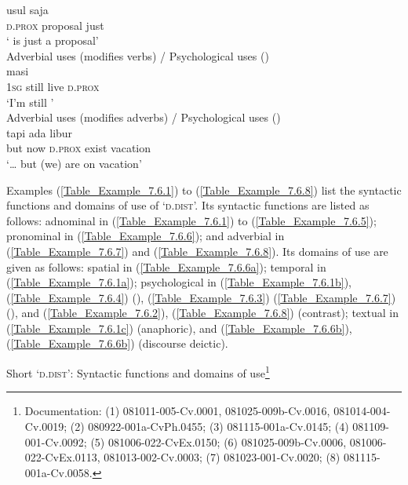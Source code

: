 {\ex\label{Table_Example_7.5.5c}
\gll  {} {usul} {saja}  \\
 \textsc{d.prox} proposal just  \\
\glt ‘ is just a proposal’\\
\z
\z
\ea\label{Table_Example_7.5.6}
Adverbial uses (modifies verbs) / Psychological uses ()\\
 {masi}    \\
 \textsc{1sg} still live \textsc{d.prox}  \\
\glt ‘I’m still   ’\\
\z
\ea\label{Table_Example_7.5.7} Adverbial uses (modifies adverbs) / Psychological uses ()\\
\gll {\ldots} {tapi}   {ada} {libur}  \\
{} but now \textsc{d.prox} exist vacation  \\
\glt ‘{\ldots} but  (we) are on vacation’ \\
\z

Examples  (\ref{Table_Example_7.6.1}) to (\ref{Table_Example_7.6.8}) list the syntactic functions and domains of use of  ‘\textsc{d.dist}’. Its syntactic functions are listed as follows: adnominal in (\ref{Table_Example_7.6.1}) to (\ref{Table_Example_7.6.5}); pronominal in (\ref{Table_Example_7.6.6}); and adverbial in (\ref{Table_Example_7.6.7}) and (\ref{Table_Example_7.6.8}). Its domains of use are given as follows: spatial in (\ref{Table_Example_7.6.6a}); temporal in (\ref{Table_Example_7.6.1a}); psychological in (\ref{Table_Example_7.6.1b}), (\ref{Table_Example_7.6.4}) (), (\ref{Table_Example_7.6.3}) (\ref{Table_Example_7.6.7}) (), and (\ref{Table_Example_7.6.2}), (\ref{Table_Example_7.6.8}) (contrast); textual in (\ref{Table_Example_7.6.1c}) (anaphoric), and (\ref{Table_Example_7.6.6b}), (\ref{Table_Example_7.6.6b}) (discourse deictic).\\


\begin{styleExampleTitle}
Short  ‘\textsc{d.dist}’: Syntactic functions and domains of use\footnote{Documentation: (1) 081011-005-Cv.0001, 081025-009b-Cv.0016, 081014-004-Cv.0019; (2) 080922-001a-CvPh.0455; (3) 081115-001a-Cv.0145; (4) 081109-001-Cv.0092; (5) 081006-022-CvEx.0150; (6) 081025-009b-Cv.0006, 081006-022-CvEx.0113, 081013-002-Cv.0003; (7) 081023-001-Cv.0020; (8) 081115-001a-Cv.0058.}
\end{styleExampleTitle}

}
